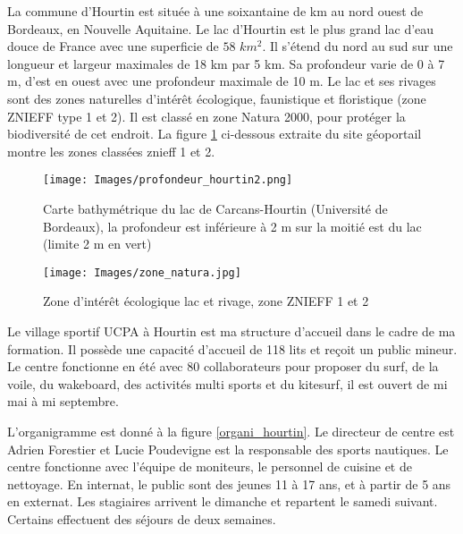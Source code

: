 \documentclass[11pt,a4paper]{report}
\begin{document}
La commune d'Hourtin est située à une soixantaine de km au nord ouest 
de Bordeaux, en Nouvelle Aquitaine. Le lac d'Hourtin est le plus grand
lac d'eau douce de France avec une superficie de $58 \,\,km^2$.
Il s'étend du nord au sud sur une longueur et largeur maximales de 18 km 
par 5 km. Sa profondeur varie de 0 à 7 m, 
d'est en ouest avec une profondeur maximale de 10 m.
Le lac et ses rivages sont des zones naturelles  d'intér\^et écologique, 
faunistique et floristique (zone ZNIEFF type 1 et 2). Il est classé
en zone  Natura 2000\cite{natura2000}, pour protéger la biodiversité
de cet endroit. La figure \ref{lac_znieff} ci-dessous extraite
du site géoportail\cite{geoportail} montre les zones classées znieff 1 et 2.


\begin{figure}
\begin{minipage}{0.4\textwidth}
\texttt{[image: Images/profondeur\_hourtin2.png]} 
\caption{Carte bathymétrique du lac de Carcans-Hourtin (Université de Bordeaux\cite{bathy}), la profondeur est inférieure
à 2 m sur la moitié est du lac (limite 2 m en vert)\label{carte_profondeur}}
\end{minipage}
\hfill
\begin{minipage}{0.4\textwidth}
\texttt{[image: Images/zone\_natura.jpg]} 
\caption{Zone d'intér\^et écologique lac et rivage, zone ZNIEFF 1 et 2\label{lac_znieff}}
 \end{minipage}
\end{figure}
\FloatBarrier
Le village sportif UCPA à Hourtin est ma structure d'accueil dans le cadre de
ma formation. Il possède une capacité d'accueil de 118 lits et reçoit un 
public mineur. Le centre fonctionne en été avec 80 collaborateurs pour
proposer du surf, de la voile, du wakeboard, des activités multi sports
et du kitesurf, il est ouvert de mi mai à mi septembre.
 
L'organigramme est donné à la figure \ref{organi_hourtin}.
Le directeur de centre est Adrien Forestier et 
Lucie Poudevigne est la responsable des sports nautiques.
Le centre fonctionne avec l'équipe de moniteurs, le personnel 
de cuisine et de nettoyage. En internat, le public sont des jeunes
11 à 17 ans, et  à partir de 5 ans  en externat.
Les stagiaires arrivent le dimanche et repartent
le samedi suivant. Certains effectuent des séjours de deux semaines.
\end{document}

